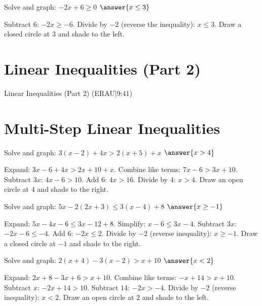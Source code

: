 \documentclass{ximera}
\begin{document}
\begin{problem}
Solve and graph: $-2x + 6 \geq 0$ $\answer{x \leq 3}$
\begin{feedback}
Subtract $6$: $-2x \geq -6$. Divide by $-2$ (reverse the inequality): $x \leq 3$. Draw a closed circle at $3$ and shade to the left.
\end{feedback}
\end{problem}


\section*{Linear Inequalities (Part 2)}

Linear Inequalities (Part 2) (ERAU|9:41)



\section*{Multi-Step Linear Inequalities}

\begin{problem}
Solve and graph: $3(x - 2) + 4x > 2(x + 5) + x$ $\answer{x > 4}$
\begin{feedback}
Expand: $3x - 6 + 4x > 2x + 10 + x$. Combine like terms: $7x - 6 > 3x + 10$. Subtract $3x$: $4x - 6 > 10$. Add $6$: $4x > 16$. Divide by $4$: $x > 4$. Draw an open circle at $4$ and shade to the right.
\end{feedback}
\end{problem}

\begin{problem}
Solve and graph: $5x - 2(2x + 3) \leq 3(x - 4) + 8$ $\answer{x \geq -1}$
\begin{feedback}
Expand: $5x - 4x - 6 \leq 3x - 12 + 8$. Simplify: $x - 6 \leq 3x - 4$. Subtract $3x$: $-2x - 6 \leq -4$. Add $6$: $-2x \leq 2$. Divide by $-2$ (reverse inequality): $x \geq -1$. Draw a closed circle at $-1$ and shade to the right.
\end{feedback}
\end{problem}

\begin{problem}
Solve and graph: $2(x + 4) - 3(x - 2) > x + 10$ $\answer{x < 2}$
\begin{feedback}
Expand: $2x + 8 - 3x + 6 > x + 10$. Combine like terms: $-x + 14 > x + 10$. Subtract $x$: $-2x + 14 > 10$. Subtract $14$: $-2x > -4$. Divide by $-2$ (reverse inequality): $x < 2$. Draw an open circle at $2$ and shade to the left.
\end{feedback}
\end{problem}
\end{document}
